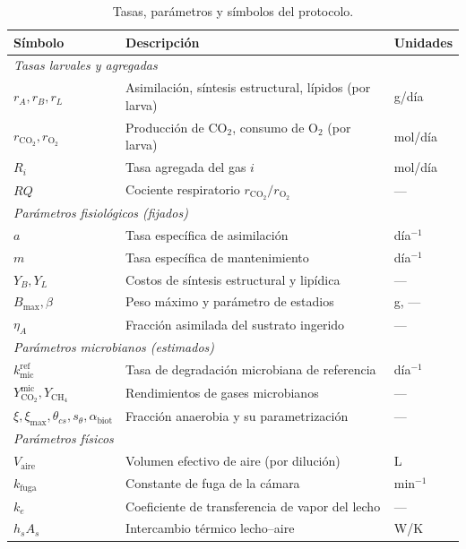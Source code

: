 \begin{table}[H]
  \centering
  \caption{Tasas, parámetros y símbolos del protocolo.}
  \label{tab:simbolos-parametros}
  \begin{tabular}{lll}
    \hline
    Símbolo & Descripción & Unidades \\
    \hline
    \multicolumn{3}{l}{\emph{Tasas larvales y agregadas}} \\
    $r_A, r_B, r_L$ & Asimilación, síntesis estructural, lípidos (por larva) & g/día \\
    $r_{\mathrm{CO_2}}, r_{\mathrm{O_2}}$ & Producción de CO$_2$, consumo de O$_2$ (por larva) & mol/día \\
    $R_i$ & Tasa agregada del gas $i$ & mol/día \\
    $RQ$ & Cociente respiratorio $r_{\mathrm{CO_2}}/r_{\mathrm{O_2}}$ & --- \\
    \multicolumn{3}{l}{\emph{Parámetros fisiológicos (fijados)}} \\
    $a$ & Tasa específica de asimilación & día$^{-1}$ \\
    $m$ & Tasa específica de mantenimiento & día$^{-1}$ \\
    $Y_B, Y_L$ & Costos de síntesis estructural y lipídica & --- \\
    $B_{\max}, \beta$ & Peso máximo y parámetro de estadios & g, --- \\
    $\eta_A$ & Fracción asimilada del sustrato ingerido & --- \\
    \multicolumn{3}{l}{\emph{Parámetros microbianos (estimados)}} \\
    $k_{\mathrm{mic}}^{\mathrm{ref}}$ & Tasa de degradación microbiana de referencia & día$^{-1}$ \\
    $Y_{\mathrm{CO_2}}^{\mathrm{mic}}, Y_{\mathrm{CH_4}}$ & Rendimientos de gases microbianos & --- \\
    $\xi, \xi_{\max}, \theta_{cs}, s_\theta, \alpha_{\mathrm{biot}}$ & Fracción anaerobia y su parametrización & --- \\
    \multicolumn{3}{l}{\emph{Parámetros físicos}} \\
    $V_{\mathrm{aire}}$ & Volumen efectivo de aire (por dilución) & L \\
    $k_{\mathrm{fuga}}$ & Constante de fuga de la cámara & min$^{-1}$ \\
    $k_e$ & Coeficiente de transferencia de vapor del lecho & --- \\
    $h_s A_s$ & Intercambio térmico lecho--aire & W/K \\

\end{tabular}
\end{table}
